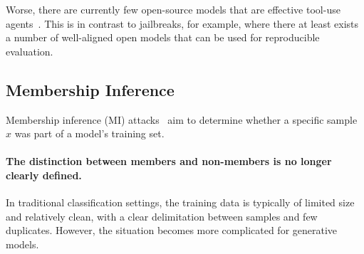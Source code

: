 Worse, there are currently few open-source models that are effective tool-use agents~\cite{debenedetti2024agentdojo}. This is in contrast to jailbreaks, for example, where there at least exists a number of well-aligned open models that can be used for reproducible evaluation.

\subsection{Membership Inference} %
\label{sec:mi}

Membership inference (MI) attacks~\citep{shokri2017membership} aim to determine whether a specific sample $x$ was part of a model's training set.%
\paragraph{The distinction between members and non-members is no longer clearly defined.} In traditional classification settings, the training data is typically of limited size and relatively clean, with a clear delimitation between samples and few duplicates. 
However, the situation becomes more complicated for generative models.

